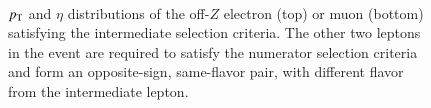 \begin{figure}[htbp]
{    
  } \\
  \caption{$p_{\text{T}}$ and $\eta$ distributions of the off-$Z$ electron (top) or muon (bottom) satisfying the intermediate selection criteria. The other two leptons in the event are required to satisfy the numerator selection criteria and form an opposite-sign, same-flavor pair, with different flavor from the intermediate lepton.}
  \label{fig:model-independent-VR-intermediate-emu}
\end{figure}



